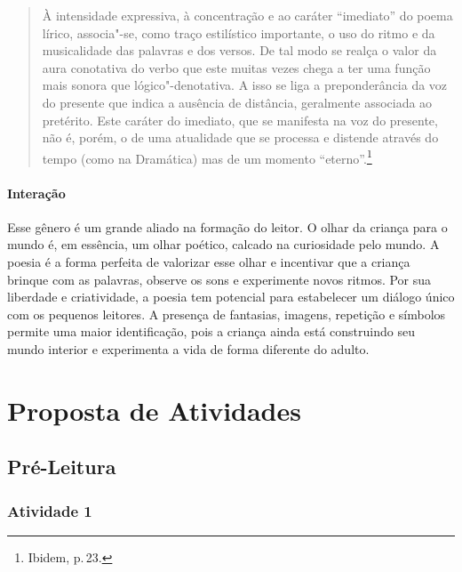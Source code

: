 \documentclass[11pt]{extarticle}
\begin{document}
\begin{quote}
À intensidade expressiva, à concentração e ao caráter ``imediato'' do poema lírico, associa"-se, como traço estilístico importante, o uso do ritmo e da musicalidade das palavras e dos versos. De tal modo se realça o valor da aura conotativa do verbo que este muitas vezes chega a ter uma função mais sonora que lógico"-denotativa. A isso se liga a preponderância da voz do presente que indica a ausência de distância, geralmente associada ao pretérito. Este caráter do imediato, que se manifesta na voz do presente, não é, porém, o de uma atualidade que se processa e distende através do tempo (como na Dramática) mas de um momento ``eterno''.\footnote{Ibidem, p.\,23.}
\end{quote}

\paragraph{Interação} Esse gênero é um grande aliado na formação do leitor. O olhar da criança para o mundo é, em essência, um olhar poético, calcado na curiosidade pelo mundo. A poesia é a forma perfeita de valorizar esse olhar e incentivar que a criança brinque com as palavras, observe os sons e experimente novos ritmos. Por sua liberdade e criatividade, a poesia tem potencial para estabelecer um diálogo único com os pequenos leitores. A presença de fantasias, imagens, repetição e símbolos permite uma maior identificação, pois a criança ainda está construindo seu mundo interior e experimenta a vida de forma diferente do adulto. 

\section{Proposta de Atividades}
\subsection{Pré-Leitura}
\subsubsection{Atividade 1}


\end{document}

